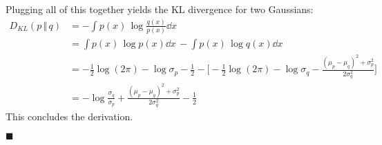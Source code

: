 \documentclass[11pt, a4paper]{scrartcl}
\newcommand{\KL}{D_\mathit{KL}}
\newcommand{\eot}{\hfill\(\blacksquare\)}
\begin{document}
			Plugging all of this together yields the KL divergence for two Gaussians:
			\begin{align}
				\KL(p \,\Vert\, q)
					&= -\int\! p(x) \, \log \frac{q(x)}{p(x)} \dd{x} \\
					&= \int\! p(x) \, \log p(x) \dd{x} \,- \int\! p(x) \, \log q(x) \dd{x} \\
					&= -\frac{1}{2} \log(2\pi) - \log\sigma_p - \frac{1}{2} - \Bigg[\! -\frac{1}{2} \log(2\pi) - \log\sigma_q - \frac{(\mu_p - \mu_q)^2 + \sigma_p^2}{2 \sigma_q^2} \Bigg] \\
					&= - \log\frac{\sigma_q}{\sigma_p} + \frac{(\mu_p - \mu_q)^2 + \sigma_p^2}{2 \sigma_q^2} - \frac{1}{2}
			\end{align}
			This concludes the derivation.

			\eot
\end{document}

